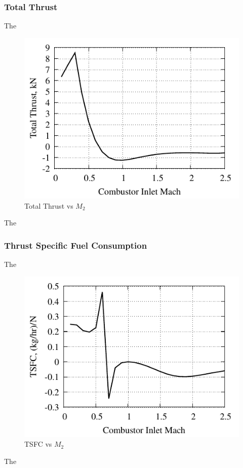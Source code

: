 \documentclass[conf]{new-aiaa} %
\begin{document}
\subsubsection{Total Thrust}
The

\begin{figure}[H] %
    \centering
    \includegraphics[]{media/performance_parameter_files/part_h_T.pdf}
    \caption{\label{fig:partht}Total Thrust vs \texorpdfstring{\textit{$M_2$}}{M2}}
\end{figure}
The

\subsubsection{Thrust Specific Fuel Consumption}
The

\begin{figure}[H] %
    \centering
    \includegraphics[]{media/performance_parameter_files/part_h_TSFC.pdf}
    \caption{\label{fig:parthtsfc}TSFC vs \texorpdfstring{\textit{$M_2$}}{M2}}
\end{figure}
The
\end{document}
